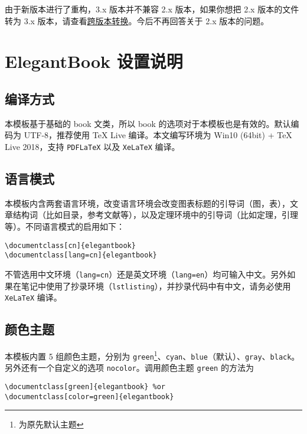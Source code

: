 \documentclass[cn,11pt,fancy,hide,pad]{elegantbook}
\begin{document}
\begin{note}
由于新版本进行了重构，3.x 版本并不兼容 2.x 版本，如果你想把 2.x 版本的文件转为 3.x 版本，请查看\href{https://github.com/ElegantLaTeX/ElegantBook/wiki/convert}{跨版本转换}。今后不再回答关于 2.x 版本的问题。
\end{note}

\chapter{ElegantBook 设置说明}

\section{编译方式}

本模板基于基础的 book 文类，所以 book 的选项对于本模板也是有效的。默认编码为 UTF-8，推荐使用 \TeX{} Live 编译。本文编写环境为 Win10 (64bit) + \TeX{} Live 2018，支持 \lstinline{PDFLaTeX} 以及 \lstinline{XeLaTeX} 编译。


\section{语言模式}
本模板内含两套语言环境，改变语言环境会改变图表标题的引导词（图，表），文章结构词（比如目录，参考文献等），以及定理环境中的引导词（比如定理，引理等）。不同语言模式的启用如下：
\begin{lstlisting}
\documentclass[cn]{elegantbook} 
\documentclass[lang=cn]{elegantbook}
\end{lstlisting}

\begin{remark}
不管选用中文环境（\lstinline{lang=cn}）还是英文环境（\lstinline{lang=en}）均可输入中文。另外如果在笔记中使用了抄录环境（\lstinline{lstlisting}），并抄录代码中有中文，请务必使用 \lstinline{XeLaTeX} 编译。
\end{remark}



\section{颜色主题}
本模板内置 5 组颜色主题，分别为 \textcolor{main1}{\lstinline{green}}\footnote{为原先默认主题}、\textcolor{main2}{\lstinline{cyan}}、\textcolor{main3}{\lstinline{blue}}（默认）、\textcolor{main4}{\lstinline{gray}}、\textcolor{main5}{\lstinline{black}}。另外还有一个自定义的选项  \lstinline{nocolor}。调用颜色主题 \lstinline{green} 的方法为 
\begin{lstlisting}
\documentclass[green]{elegantbook} %or
\documentclass[color=green]{elegantbook}
\end{lstlisting}
\end{document}
